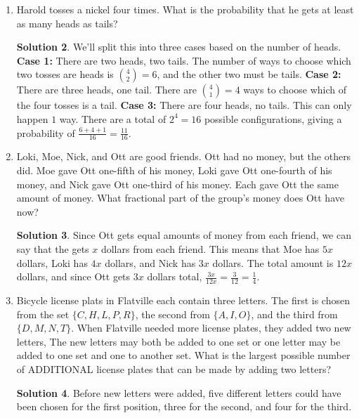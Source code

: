 \documentclass{article}
\theoremstyle{definition}
\newtheorem*{solution}{Solution}
\begin{document}
\begin{multicols}{2}
\begin{enumerate}
\begin{solution}
                So, our answer is $1$.
            \end{solution}
        \item Harold tosses a nickel four times.
            What is the probability that he gets at least as many heads as tails?
            \begin{solution}
				We'll split this into three cases based on the number of heads.
                \textbf{Case 1:} There are two heads, two tails.
				The number of ways to choose which two tosses are heads is $\binom{4}{2} = 6$, and the other two must be tails.
                \textbf{Case 2:} There are three heads, one tail.
				There are $\binom{4}{1} = 4$ ways to choose which of the four tosses is a tail.
                \textbf{Case 3:} There are four heads, no tails.
                This can only happen $1$ way.
                There are a total of $2^4 = 16$ possible configurations, giving a probability of $\frac{6 + 4 + 1}{16} = \frac{11}{16}$.
            \end{solution}
        \item Loki, Moe, Nick, and Ott are good friends.
            Ott had no money, but the others did.
            Moe gave Ott one-fifth of his money, Loki gave Ott one-fourth of his money, and Nick gave Ott one-third of his money.
            Each gave Ott the same amount of money.
            What fractional part of the group's money does Ott have now?
            \begin{solution}
                Since Ott gets equal amounts of money from each friend, we can say that the gets $x$ dollars from each friend.
                This means that Moe has $5x$ dollars, Loki has $4x$ dollars, and Nick has $3x$ dollars.
                The total amount is $12x$ dollars, and since Ott gets $3x$ dollars total, $\frac{3x}{12x} = \frac{3}{12} = \frac{1}{4}$.
            \end{solution}
        \item Bicycle license plats in Flatville each contain three letters.
            The first is chosen from the set $\{C,H,L,P,R\}$, the second from $\{A,I,O\}$, and the third from $\{D,M,N,T\}$.
            When Flatville needed more license plates, they added two new letters, The new letters may both be added to one set or one letter may be added to one set and one to another set.
            What is the largest possible number of ADDITIONAL license plates that can be made by adding two letters?
            \begin{solution}
                Before new letters were added, five different letters could have been chosen for the first position, three for the second, and four for the third.

\end{solution}
\end{enumerate}
\end{multicols}
\end{document}
